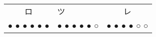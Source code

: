 \begin{center}
\begin{tabular}{>{\Huge}c >{\Huge}l >{\Huge}c}
\toprule
ロ & ツ & レ \\
\parbox[b][10cm][s]{0cm} { ● ● ● ● ● ● } & \parbox[b][10cm][s]{0cm} { ● ● ● ● ● ○ } & \parbox[b][10cm][s]{0cm} { ● ● ● ● ○ ○ } \\ \bottomrule
\end{tabular}
\end{center}
